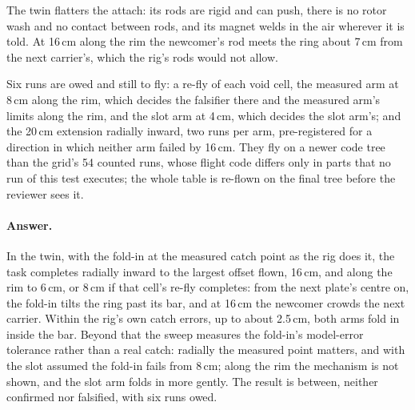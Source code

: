 The twin flatters the attach: its rods are rigid and can push, there is no rotor wash and no contact between rods, and
its magnet welds in the air wherever it is told. At 16\,cm along the rim the newcomer's rod meets the ring about 7\,cm
from the next carrier's, which the rig's rods would not allow.

Six runs are owed and still to fly: a re-fly of each void cell, the measured arm at 8\,cm along the rim, which decides
the falsifier there and the measured arm's limits along the rim, and the slot arm at 4\,cm, which decides the slot
arm's; and the 20\,cm extension radially inward, two runs per arm, pre-registered for a direction in which neither arm
failed by 16\,cm. They fly on a newer code tree than the grid's 54 counted runs, whose flight code differs only in parts
that no run of this test executes; the whole table is re-flown on the final tree before the reviewer sees it.


\paragraph{Answer.} In the twin, with the fold-in at the measured catch point as the rig does it, the task completes
radially inward to the largest offset flown, 16\,cm, and along the rim to 6\,cm, or 8\,cm if that cell's re-fly
completes: from the next plate's centre on, the fold-in tilts the ring past its bar, and at 16\,cm the newcomer crowds
the next carrier. Within the rig's own catch errors, up to about 2.5\,cm, both arms fold in inside the bar. Beyond that
the sweep measures the fold-in's model-error tolerance rather than a real catch: radially the measured point matters,
and with the slot assumed the fold-in fails from 8\,cm; along the rim the mechanism is not shown, and the slot arm folds
in more gently. The result is between, neither confirmed nor falsified, with six runs owed.
